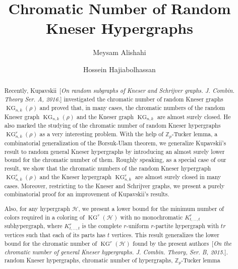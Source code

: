 \documentclass[11pt]{amsart}
\title{Chromatic Number of Random Kneser Hypergraphs}
\author{Meysam Alishahi}
\author{Hossein Hajiabolhassan}
\theoremstyle{definition}
\theoremstyle{remark}
\def\Z{\mathbb{Z}}
\def\KG{\operatorname{KG}}
\def\HH{\mathcal{H}}
\begin{document}
\maketitle

\begin{abstract} 
Recently, Kupavskii~[{\it On random subgraphs of {K}neser and {S}chrijver 
graphs.  J. Combin. Theory Ser. A, {\rm 2016}.}] investigated the chromatic 
number of random Kneser graphs 
$\KG_{n,k}(\rho)$ and proved that, in many cases, 
the chromatic numbers of  the random Kneser graph $\KG_{n,k}(\rho)$ 
and  the Kneser graph $\KG_{n,k}$ are almost surely closed. He also marked the studying of the chromatic 
number of random Kneser hypergraphs $\KG^r_{n,k}(\rho)$ as a very interesting problem. 
With the help of $\Z_p$-Tucker lemma, a combinatorial generalization of the Borsuk-Ulam theorem, we generalize Kupavskii's result to random general  Kneser hypergraphs by   
introducing an almost surely lower bound for the chromatic number of them. 
Roughly speaking, as a special case of our result,  we show that the chromatic numbers of  the random Kneser hypergraph $\KG^r_{n,k}(\rho)$ and the Kneser hypergraph $\KG^r_{n,k}$ are almost surely closed in many cases.  Moreover,  restricting to the Kneser and {S}chrijver graphs, we present a purely combinatorial proof for  an improvement of Kupavskii's results. 

Also, for any hypergraph $\HH$, we present a lower bound for  
the minimum number of colors required in 
a coloring of $\KG^r(\mathcal{H})$ with no monochromatic  $K_{t,\ldots,t}^r$ subhypergraph, 
where $K_{t,\ldots,t}^r$ is the complete $r$-uniform $r$-partite hypergraph with $t r$ 
vertices such that each of its parts has $t$ vertices. 
This result generalizes the lower bound for the chromatic number of 
$\KG^r(\mathcal{H})$ found by the present authors~[{\it On the chromatic number of general 
{K}neser hypergraphs.  J.  Combin. Theory, Ser. B, 
  {\rm 2015}.}]. \\

 random Kneser hypergraphs, chromatic number of hypergraphs, $\mathbb{Z}_p$-Tucker lemma
\end{abstract}
\end{document}
